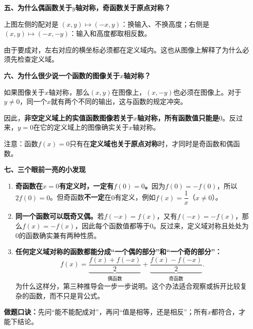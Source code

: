 \clearpage
\begin{explanationbox}
\textbf{五、为什么偶函数关于$y$轴对称，奇函数关于原点对称？}


\begin{center}

\end{center}




上图左侧的配对是 $(x,y)\mapsto(-x,y)$：换输入、不换高度；右侧是 $(x,y)\mapsto(-x,-y)$：输入和高度都取相反数。

由于要成对，左右对应的横坐标必须都在定义域内。这也从图像上解释了为什么必须先检查定义域。

\medskip
\end{explanationbox}
\clearpage
\begin{explanationbox}
\textbf{六、为什么很少说一个函数的图像关于$x$轴对称？}

如果图像关于$x$轴对称，那么$(x,y)$在图像上，$(x,-y)$也必须在图像上。对于$y\ne0$，同一个$x$就有两个不同的输出，这与函数的规定冲突。

因此，\textbf{非空定义域上的实值函数图像若关于$x$轴对称，所有函数值只能是$0$}。反过来，$y=0$在它的定义域上的图像确实关于$x$轴对称。


\begin{center}

\end{center}


注意：函数$f(x)=0$只有在\textbf{定义域也关于原点对称}时，才同时是奇函数和偶函数。

\medskip
\end{explanationbox}
\clearpage
\begin{explanationbox}
\textbf{七、三个眼前一亮的小发现}


\begin{enumerate}[leftmargin=*,itemsep=0.45em]
\item \textbf{奇函数在$x=0$有定义时，一定有$f(0)=0$。}因为$f(0)=-f(0)$，所以$2f(0)=0$。但奇函数\textbf{不一定}在$0$有定义，例如$f(x)=\dfrac1x$（$x\ne0$）。
\item \textbf{同一个函数可以既奇又偶。}若$f(-x)=f(x)$，又有$f(-x)=-f(x)$，那么$f(x)=-f(x)$，因此每个函数值都等于$0$。反过来，定义域对称且处处为$0$的函数确实兼有两种性质。
\item \textbf{任何定义域对称的函数都能分成“一个偶的部分”和“一个奇的部分”：}
\[
\boxed{f(x)=\underbrace{\frac{f(x)+f(-x)}2}_{\text{偶函数}}+\underbrace{\frac{f(x)-f(-x)}2}_{\text{奇函数}}.}
\]
为什么这样分，第三种推导会一步一步说明。这个办法适合观察或拆开比较复杂的函数，而不只是背公式。
\end{enumerate}

\medskip
\textbf{做题口诀：}先问“能不能配成对”，再问“值是相等，还是相反”；所有$x$都符合，才能下结论。
\end{explanationbox}
